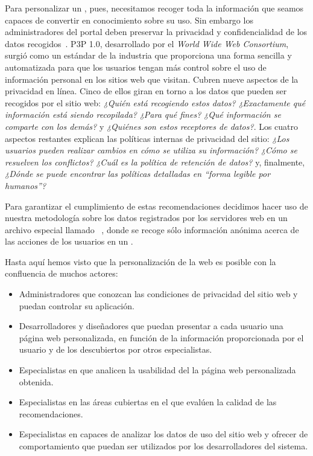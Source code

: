 Para personalizar un \portalWeb, pues, necesitamos recoger toda la información que seamos capaces de convertir en conocimiento sobre su uso. Sin embargo los administradores del portal deben preservar la privacidad y confidencialidad de los datos recogidos~\citep{W3CP3P,LamFrankowskiRiedl_DoYouTrustYourRecommendations_2006,RozenbergGudes_ARMInVerticallyPartitionedDBs_2006}. {P3P 1.0}, desarrollado por el \textsl{World Wide Web Consortium}, surgió como un estándar de la industria que proporciona una forma sencilla y automatizada para que los usuarios tengan más control sobre el uso de información personal en los sitios web que visitan. Cubren nueve aspectos de la privacidad en línea. Cinco de ellos giran en torno a los datos que pueden ser recogidos por el sitio web: \textsl{¿Quién está recogiendo estos datos?} \textsl{¿Exactamente qué información está siendo recopilada?} \textsl{¿Para qué fines?} \textsl{¿Qué información se comparte con los demás?} y \textsl{¿Quiénes son estos receptores de datos?}. Los cuatro aspectos restantes explican las políticas internas de privacidad del sitio: \textsl{¿Los usuarios pueden realizar cambios en cómo se utiliza su información?} \textsl{¿Cómo se resuelven los conflictos?} \textsl{¿Cuál es la política de retención de datos?} y, finalmente, \textsl{¿Dónde se puede encontrar las políticas detalladas en "`forma legible por humanos"'?} 

Para garantizar el cumplimiento de estas recomendaciones decidimos hacer uso de nuestra metodología sobre los datos registrados por los servidores web en un archivo especial llamado \flog~\citep{W3Clogfile}, donde se recoge sólo información anónima acerca de las acciones de los usuarios en un \portalWeb.

Hasta aquí hemos visto que la personalización de la web es posible con la confluencia de muchos actores:
\begin{itemize}
	\item Administradores que conozcan las condiciones de privacidad del sitio web y puedan controlar su aplicación.
  \item Desarrolladores y diseñadores que puedan presentar a cada usuario una página web personalizada, en función de la información proporcionada por el usuario y de los \patrones descubiertos por otros especialistas.
  \item Especialistas en \UX que analicen la usabilidad del la página web personalizada obtenida.
  \item Especialistas en las áreas cubiertas en el \portalWeb que evalúen la calidad de las recomendaciones.
  \item Especialistas en \dm capaces de analizar los datos de uso del sitio web y ofrecer \patrones de comportamiento que puedan ser utilizados por los desarrolladores del sistema.
\end{itemize}

